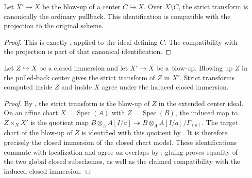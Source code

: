 \begin{lemma}
  \label{lemma:nagata-strict-transform-restrict}

  Let $X'\to X$ be the blow-up of a center $C\hookrightarrow X$.  Over
  $X\setminus C$, the strict transform is canonically the ordinary pullback.
  This identification is compatible with the projection to the original
  scheme.
\end{lemma}

\begin{proof}
  This is exactly
  , applied to the ideal
  defining $C$.  The compatibility with the projection is part of that
  canonical identification.
\end{proof}

\begin{lemma}
  \label{lemma:nagata-strict-transform-ambient-closed}

  Let $Z\hookrightarrow X$ be a closed immersion and let $X'\to X$ be a
  blow-up.  Blowing up $Z$ in the pulled-back center gives the strict transform
  of $Z$ in $X'$.  Strict transforms computed inside $Z$ and inside $X$ agree
  under the induced closed immersion.
\end{lemma}

\begin{proof}
  By , the strict transform is the
  blow-up of $Z$ in the extended center ideal.  On an affine chart
  $X=\operatorname{Spec}(A)$ with $Z=\operatorname{Spec}(B)$, the induced
  map to $Z\times_XX'$ is the quotient map
  $B\otimes_AA[I/a]\twoheadrightarrow
  B\otimes_AA[I/a]/\Gamma_{(a)}$.  The target chart of the blow-up of $Z$ is
  identified with this quotient by
  .  It is therefore precisely
  the closed immersion of the closed chart model.  These identifications
  commute with localization and agree on overlaps by
  ; gluing proves
  equality of the two global closed subschemes, as well as the claimed
  compatibility with the induced closed immersion.
\end{proof}

